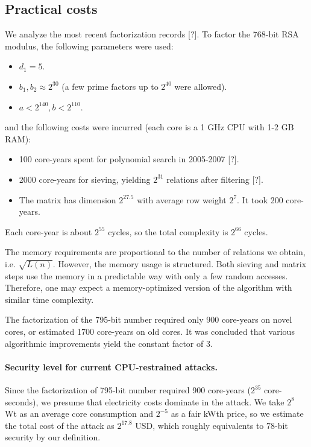 \documentclass[a4paper]{article}
\begin{document}
\subsection{Practical costs} We analyze the most recent factorization records [?]. To factor the 768-bit RSA modulus, the following parameters were used:
\begin{itemize}
    \item $d_1= 5$.
    \item $b_1,b_2 \approx 2^{30}$ (a few prime factors up to $2^{40}$ were allowed). 
    \item $a<2^{140}, b<2^{110}$.
\end{itemize}
and the following costs were incurred (each core is a 1 GHz CPU with 1-2 GB RAM):
\begin{itemize}
    \item 100 core-years spent for polynomial search in 2005-2007 [?].
    \item 2000 core-years for sieving, yielding $2^{31}$ relations after filtering [?].
    \item The matrix has dimension $2^{27.5}$  with average row weight $2^7$. It took 200 core-years.
\end{itemize}
Each core-year is about $2^{55}$ cycles, so the total complexity is $2^{66}$ cycles. 

The memory requirements are proportional to the number of relations we obtain, i.e. $\sqrt{L(n)}$. However, the memory usage is structured. Both sieving and matrix steps use the memory in a predictable way with only a few random accesses. Therefore, one may expect a memory-optimized version of the algorithm with similar time complexity.

The factorization of the 795-bit number required only 900 core-years on novel cores, or estimated 1700 core-years on old cores. It was concluded that various algorithmic improvements yield the constant factor of 3.


 
\paragraph{Security level for current CPU-restrained attacks.} Since the factorization of 795-bit number required 900 core-years ($2^{35}$ core-seconds), we presume that electricity costs dominate in the attack. We take $2^8$ Wt as an average core consumption and $2^{-5}$ as a fair kWth price, so we  estimate the total cost of the attack as   $2^{17.8}$ USD, which roughly equivalents to 78-bit security by our definition.
\end{document}
